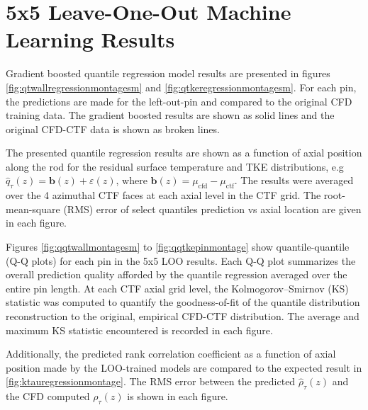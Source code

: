 


\section{5x5 Leave-One-Out Machine Learning Results}


Gradient boosted quantile regression model results are presented in figures \ref{fig:qtwallregressionmontagesm} and \ref{fig:qtkeregressionmontagesm}.  For each pin, the predictions are made for the left-out-pin and compared to the original CFD training data.  The gradient boosted results are shown as solid lines and the original CFD-CTF data is shown as broken lines. 

The presented quantile regression results are shown as a function of axial position along the rod for the residual surface temperature and TKE distributions, e.g $\hat q_{\tau}(z) = \mathbf b(z) + \varepsilon(z)$, where $\mathbf b(z) = \mu_{\mathrm{cfd}} - \mu_{\mathrm{ctf}}$.   The results were averaged over the 4 azimuthal CTF faces at each axial level in the CTF grid.   The root-mean-square (RMS) error of select quantiles prediction vs axial location are given in each figure.

Figures \ref{fig:qqtwallmontagesm} to \ref{fig:qqtkepinmontage} show quantile-quantile (Q-Q plots) for each pin in the 5x5 LOO results.  Each Q-Q plot summarizes the overall prediction quality afforded by the quantile regression averaged over the entire pin length.  At each CTF axial grid level, the Kolmogorov–Smirnov (KS) statistic was computed to quantify the goodness-of-fit of the quantile distribution reconstruction to the original, empirical CFD-CTF distribution. The average and maximum KS statistic encountered is recorded in each figure.

Additionally, the predicted rank correlation coefficient as a function of axial position made by the LOO-trained models are compared to the expected result in \ref{fig:ktauregressionmontage}.  The RMS error between the predicted $\hat \rho_\tau(z)$ and the CFD computed $\rho_\tau(z)$ is shown in each figure.


